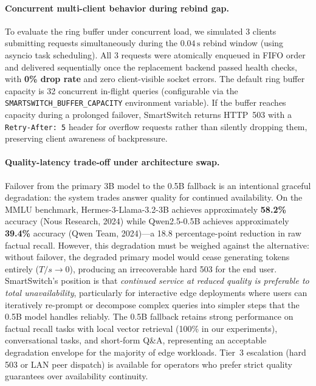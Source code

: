 \documentclass[11pt,a4paper]{article}
\newcommand{\su}{\,\mathrm{s}}
\newcommand{\code}[1]{\texttt{#1}}
\begin{document}
\paragraph{Concurrent multi-client behavior during rebind gap.}
To evaluate the ring buffer under concurrent load, we simulated 3 clients submitting requests simultaneously during the $0.04\su$ rebind window (using asyncio task scheduling). All 3 requests were atomically enqueued in FIFO order and delivered sequentially once the replacement backend passed health checks, with \textbf{0\% drop rate} and zero client-visible socket errors. The default ring buffer capacity is 32 concurrent in-flight queries (configurable via the \code{SMARTSWITCH\_BUFFER\_CAPACITY} environment variable). If the buffer reaches capacity during a prolonged failover, SmartSwitch returns HTTP~503 with a \code{Retry-After: 5} header for overflow requests rather than silently dropping them, preserving client awareness of backpressure.

\paragraph{Quality-latency trade-off under architecture swap.}
Failover from the primary 3B model to the 0.5B fallback is an intentional graceful degradation: the system trades answer quality for continued availability. On the MMLU benchmark, Hermes-3-Llama-3.2-3B achieves approximately \textbf{58.2\%} accuracy (Nous Research, 2024) while Qwen2.5-0.5B achieves approximately \textbf{39.4\%} accuracy (Qwen Team, 2024)---a 18.8 percentage-point reduction in raw factual recall. However, this degradation must be weighed against the alternative: without failover, the degraded primary model would cease generating tokens entirely ($T/s \to 0$), producing an irrecoverable hard 503 for the end user. SmartSwitch's position is that \emph{continued service at reduced quality is preferable to total unavailability}, particularly for interactive edge deployments where users can iteratively re-prompt or decompose complex queries into simpler steps that the 0.5B model handles reliably. The 0.5B fallback retains strong performance on factual recall tasks with local vector retrieval (100\% in our experiments), conversational tasks, and short-form Q\&A, representing an acceptable degradation envelope for the majority of edge workloads. Tier~3 escalation (hard 503 or LAN peer dispatch) is available for operators who prefer strict quality guarantees over availability continuity.
\end{document}
